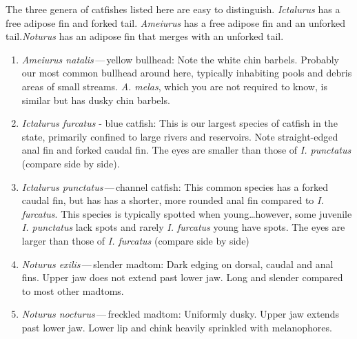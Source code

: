 \documentclass[11pt, hidelinks]{exam}
\begin{document}
The three genera of catfishes listed here are easy to distinguish.  \textit{Ictalurus} has a free adipose fin and forked tail. \textit{Ameiurus} has a free adipose fin and an unforked tail.\textit{Noturus} has an adipose fin that merges with an unforked tail.

\begin{enumerate}

\item \textit{Ameiurus natalis}\,—\,yellow bullhead:  Note the white chin barbels.  Probably our most common bullhead around here, typically inhabiting pools and debris areas of small streams. \textit{A. melas}, which you are not required to know, is similar but has dusky chin barbels.

\item \textit{Ictalurus furcatus} - blue catfish:  This is our largest species of catfish in the state, primarily confined to large rivers and reservoirs.  Note straight-edged anal fin and forked caudal fin. The eyes are smaller than those of \textit{I. punctatus} (compare side by side).

\item \textit{Ictalurus punctatus}\,—\,channel catfish:  This common species has a forked caudal fin, but has has a shorter, more rounded anal fin compared to \textit{I. furcatus}.  This species is typically spotted when young…however, some juvenile \textit{I. punctatus} lack spots and rarely \textit{I. furcatus} young have spots. The eyes are larger than those of \textit{I. furcatus} (compare side by side)

\item \textit{Noturus exilis}\,—\,slender madtom:  Dark edging on dorsal, caudal and anal fins. Upper jaw does not extend past lower jaw. Long and slender compared to most other madtoms.

\item \textit{Noturus nocturus}\,—\,freckled madtom: Uniformly dusky. Upper jaw extends past lower jaw. Lower lip and chink heavily sprinkled with melanophores.

\end{enumerate}
\end{document}
